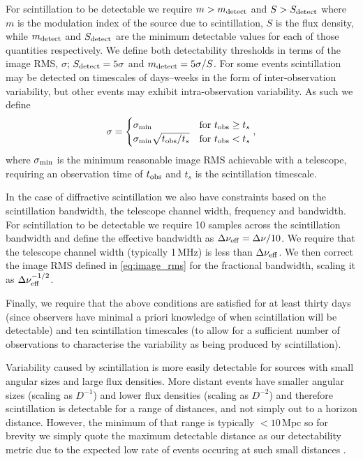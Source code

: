 For scintillation to be detectable we require $m > m_{\rm detect}$ and $S > S_{\rm detect}$ where $m$ is the modulation index of the source due to scintillation, $S$ is the flux density, while $m_{\rm detect}$ and $S_{\rm detect}$ are the minimum detectable values for each of those quantities respectively. We define both detectability thresholds in terms of the image RMS, $\sigma$; $S_{\rm detect} = 5\sigma$ and $m_{\rm detect} = 5\sigma / S$. For some events scintillation may be detected on timescales of days--weeks in the form of inter-observation variability, but other events may exhibit intra-observation variability. As such we define
\vspace{-3pt}
\begin{equation}
    \sigma =
    \begin{cases}
    \sigma_{\rm min} & \text{for }  t_{\rm obs} \geq t_s\\
    \sigma_{\rm min}\sqrt{t_{\rm obs}/t_s} & \text{for }  t_{\rm obs} < t_s
    \end{cases},
    \label{eq:image_rms}
\end{equation}
\vspace{-3pt}where $\sigma_{\rm min}$ is the minimum reasonable image RMS achievable with a telescope, requiring an observation time of $t_{\rm obs}$ and $t_s$ is the scintillation timescale.

In the case of diffractive scintillation we also have constraints based on the scintillation bandwidth, the telescope channel width, frequency and bandwidth. For scintillation to be detectable we require 10 samples across the scintillation bandwidth and define the effective bandwidth as $\Delta\nu_{\rm eff}=\Delta\nu/10$. We require that the telescope channel width (typically 1\,MHz) is less than $\Delta\nu_{\rm eff}$. We then correct the image RMS defined in \eqref{eq:image_rms} for the fractional bandwidth, scaling it as $\Delta\nu_{\rm eff}^{-1/2}$.

Finally, we require that the above conditions are satisfied for at least thirty days (since observers have minimal a priori knowledge of when scintillation will be detectable) and ten scintillation timescales (to allow for a sufficient number of observations to characterise the variability as being produced by scintillation).

Variability caused by scintillation is more easily detectable for sources with small angular sizes and large flux densities. More distant events have smaller angular sizes (scaling as $D^{-1}$) and lower flux densities (scaling as $D^{-2}$) and therefore scintillation is detectable for a range of distances, and not simply out to a horizon distance. However, the minimum of that range is typically $<10$\,Mpc so for brevity we simply quote the maximum detectable distance as our detectability metric due to the expected low rate of events occuring at such small distances \citep{2019PhRvX...9c1040A}.



